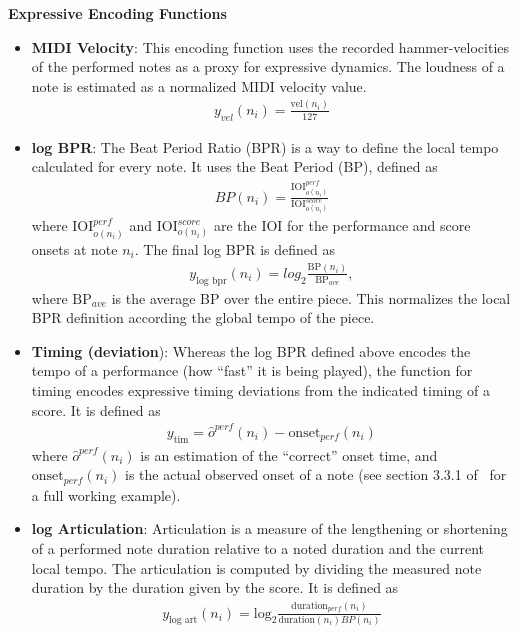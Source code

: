 \newcommand{\iois}{\textrm{IOI}_{o(n_i)}^{score}}
\newcommand{\ioip}{\textrm{IOI}_{o(n_i)}^{perf}}
\textbf{Expressive Encoding Functions}
\begin{itemize}
    \item \textbf{MIDI Velocity}: This encoding function uses the recorded hammer-velocities of the performed notes as a proxy for expressive dynamics. The loudness of a note is estimated as a normalized MIDI velocity value. 
    \begin{align*}
    y_{vel}(n_i) = \frac{\textrm{vel}(n_i)}{127}
    \end{align*}
    \item \textbf{log BPR}: The Beat Period Ratio (BPR) is a way to define the local tempo calculated for every note. It uses the Beat Period (BP), defined as 
        \begin{align*}
        BP(n_i) = \frac{\ioip}{\iois}
        \end{align*}
    where $\ioip$ and $\iois$ are the IOI for the performance and score onsets at note $n_i$. The final log BPR is defined as 
        \begin{align*}
        y_{\textrm{log bpr}}(n_i) = log_2\frac{\textrm{BP}(n_i)}{\textrm{BP}_{ave}},
        \end{align*}
    where $\textrm{BP}_{ave}$ is the average BP over the entire piece. This normalizes the local BPR definition according the global tempo of the piece. 
    \item \textbf{Timing (deviation}): Whereas the log BPR defined above encodes the tempo of a performance (how ``fast'' it is being played), the function for timing encodes expressive timing deviations from the indicated timing of a score. It is defined as 
        \begin{align*}
        y_{\textrm{tim}} = \hat{o}^{perf}(n_i) - \textrm{onset}_{perf}(n_i)
        \end{align*}
     where $\hat{o}^{perf}(n_i)$ is an estimation of the ``correct'' onset time, and $\textrm{onset}_{perf}(n_i)$ is the actual observed onset of a note (see section 3.3.1 of~\citet{eduardo2018computational} for a full working example). 
    \item \textbf{log Articulation}: Articulation is a measure of the lengthening or shortening of a performed note duration relative to a noted duration and the current local tempo. The articulation is computed by dividing the measured note duration by the duration given by the score. It is defined as 
        \begin{align*}
        y_{\textrm{log art}}(n_i) = \textrm{log}_2\frac{\textrm{duration}_{perf}(n_i)}{\textrm{duration}(n_i)BP(n_i)}
        \end{align*}
    
\end{itemize}

